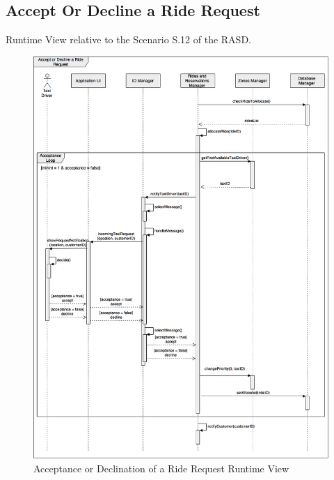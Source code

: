 \documentclass[../../../../../../dd.tex]{subfiles}
\begin{document}
	\subsection{Accept Or Decline a Ride Request}
		Runtime View relative to the Scenario S.12 of the RASD.
		\begin{figure}[H]
				\centering
				\includegraphics[width=\textwidth, scale=0.5]{../images/SequenceDiagrams/acceptDeclineRideRequest.png}
			\caption{Acceptance or Declination of a Ride Request Runtime View}\label{fig:RuntimeAcceptDeclineRequest}
		\end{figure}
		
\end{document}
